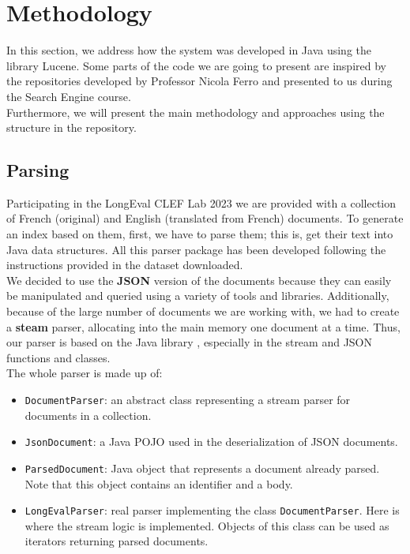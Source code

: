 \section{Methodology}
\label{sec:methodology}
In this section, we address how the system was developed in Java using the library Lucene.
Some parts of the code we are going to present are inspired by the repositories developed by Professor Nicola Ferro and
presented to us during the Search Engine course. \\
Furthermore, we will present the main methodology and approaches using the structure in the repository\cite{jihuming}.

\subsection{Parsing}
Participating in the LongEval CLEF Lab 2023 we are provided with a collection of French (original) and English
(translated from French) documents.
To generate an index based on them, first, we have to parse them;
this is, get their text into Java data structures.
All this parser package has been developed following the instructions provided in the dataset downloaded.\\
We decided to use the \textbf{JSON} version of the documents because they can easily be manipulated and queried using a
variety of tools and libraries.
Additionally, because of the large number of documents we are working with, we had to create a \textbf{steam} parser,
allocating into the main memory one document at a time.
Thus, our parser is based on the Java library , especially in the stream and JSON functions and classes.\\
The whole parser is made up of:
\begin{itemize}
    \item \texttt{DocumentParser}: an abstract class representing a stream parser for documents in a collection.
    \item \texttt{JsonDocument}: a Java POJO used in the deserialization of JSON documents.
    \item \texttt{ParsedDocument}: Java object that represents a document already parsed.
Note that this object contains an identifier and a body.
    \item \texttt{LongEvalParser}: real parser implementing the class \texttt{DocumentParser}.
Here is where the stream logic is implemented.
Objects of this class can be used as iterators returning parsed documents.
\end{itemize}

